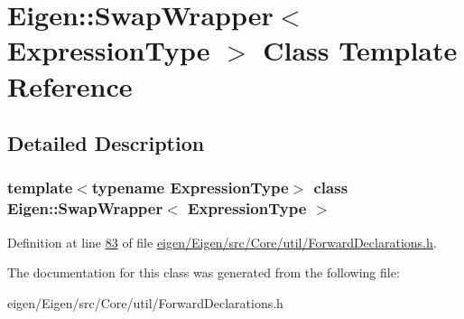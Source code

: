 \hypertarget{class_eigen_1_1_swap_wrapper}{}\section{Eigen\+:\+:Swap\+Wrapper$<$ Expression\+Type $>$ Class Template Reference}
\label{class_eigen_1_1_swap_wrapper}


\subsection{Detailed Description}
\subsubsection*{template$<$typename Expression\+Type$>$\newline
class Eigen\+::\+Swap\+Wrapper$<$ Expression\+Type $>$}



Definition at line \hyperlink{eigen_2_eigen_2src_2_core_2util_2_forward_declarations_8h_source_l00083}{83} of file \hyperlink{eigen_2_eigen_2src_2_core_2util_2_forward_declarations_8h_source}{eigen/\+Eigen/src/\+Core/util/\+Forward\+Declarations.\+h}.



The documentation for this class was generated from the following file\+:\begin{DoxyCompactItemize}
\item 
eigen/\+Eigen/src/\+Core/util/\+Forward\+Declarations.\+h\end{DoxyCompactItemize}
